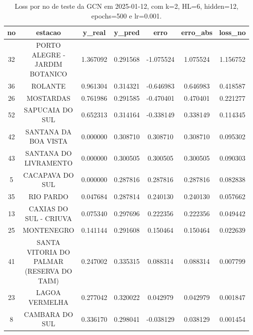 \begin{table}[h]
\centering
\caption{Loss por no de teste da GCN em 2025-01-12, com k=2, HL=6, hidden=12, epochs=500 e lr=0.001.}
\label{tab:gcn_loss_k2_hl6_h12_e500_d20250112}
\begin{tabular}{ccccccc}
\toprule
no & estacao & y\_real & y\_pred & erro & erro\_abs & loss\_no \\
\midrule
32 & PORTO ALEGRE - JARDIM BOTANICO & 1.367092 & 0.291568 & -1.075524 & 1.075524 & 1.156752 \\
36 & ROLANTE & 0.961304 & 0.314321 & -0.646983 & 0.646983 & 0.418587 \\
26 & MOSTARDAS & 0.761986 & 0.291585 & -0.470401 & 0.470401 & 0.221277 \\
52 & SAPUCAIA DO SUL & 0.652313 & 0.314164 & -0.338149 & 0.338149 & 0.114345 \\
42 & SANTANA DA BOA VISTA & 0.000000 & 0.308710 & 0.308710 & 0.308710 & 0.095302 \\
43 & SANTANA DO LIVRAMENTO & 0.000000 & 0.300505 & 0.300505 & 0.300505 & 0.090303 \\
5 & CACAPAVA DO SUL & 0.000000 & 0.287816 & 0.287816 & 0.287816 & 0.082838 \\
35 & RIO PARDO & 0.047684 & 0.287814 & 0.240130 & 0.240130 & 0.057662 \\
13 & CAXIAS DO SUL - CRIUVA & 0.075340 & 0.297696 & 0.222356 & 0.222356 & 0.049442 \\
25 & MONTENEGRO & 0.141144 & 0.291608 & 0.150464 & 0.150464 & 0.022639 \\
41 & SANTA VITORIA DO PALMAR (RESERVA DO TAIM) & 0.247002 & 0.335315 & 0.088314 & 0.088314 & 0.007799 \\
23 & LAGOA VERMELHA & 0.277042 & 0.320022 & 0.042979 & 0.042979 & 0.001847 \\
8 & CAMBARA DO SUL & 0.336170 & 0.298041 & -0.038129 & 0.038129 & 0.001454 \\
\bottomrule
\end{tabular}
\end{table}
